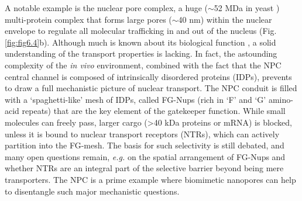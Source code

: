 A notable example is the nuclear pore complex, a huge ($\sim$52 MDa in yeast \cite{Kim2018}) multi-protein complex that forms large pores ($\sim$40 nm) within the nuclear envelope to regulate all molecular trafficking in and out of the nucleus (Fig. \ref{fig:fig6.4}b). Although much is known about its biological function \cite{Jovanovic-Talisman2017}, a solid understanding of the transport properties is lacking. In fact, the astounding complexity of the \emph{in vivo} environment, combined with the fact that the NPC central channel is composed of intrinsically disordered proteins (IDPs), prevents to draw a full mechanistic picture of nuclear transport. The NPC conduit is filled with a ‘spaghetti-like’ mesh of IDPs, called FG-Nups (rich in ‘F’ and ‘G’ amino-acid repeats) that are the key element of the gatekeeper function. While small molecules can freely pass, larger cargo (>40 kDa proteins or mRNA) is blocked, unless it is bound to nuclear transport receptors (NTRs), which can actively partition into the FG-mesh. The basis for such selectivity is still debated, and many open questions remain, \emph{e.g.} on the spatial arrangement of FG-Nups and whether NTRs are an integral part of the selective barrier beyond being mere transporters. The NPC is a prime example where biomimetic nanopores can help to disentangle such major mechanistic questions.


